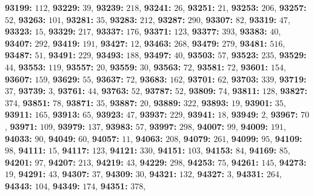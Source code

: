 \textsf{\bfseries 93199:} $112$, \textsf{\bfseries 93229:} $39$, \textsf{\bfseries 93239:} $218$, \textsf{\bfseries 93241:} $26$, \textsf{\bfseries 93251:} $21$, \textsf{\bfseries 93253:} $206$, \textsf{\bfseries 93257:} $52$, \textsf{\bfseries 93263:} $101$, \textsf{\bfseries 93281:} $35$, \textsf{\bfseries 93283:} $212$, \textsf{\bfseries 93287:} $290$, \textsf{\bfseries 93307:} $82$, \textsf{\bfseries 93319:} $47$, \textsf{\bfseries 93323:} $15$, \textsf{\bfseries 93329:} $217$, \textsf{\bfseries 93337:} $176$, \textsf{\bfseries 93371:} $123$, \textsf{\bfseries 93377:} $393$, \textsf{\bfseries 93383:} $40$, \textsf{\bfseries 93407:} $292$, \textsf{\bfseries 93419:} $191$, \textsf{\bfseries 93427:} $12$, \textsf{\bfseries 93463:} $268$, \textsf{\bfseries 93479:} $279$, \textsf{\bfseries 93481:} $516$, \textsf{\bfseries 93487:} $51$, \textsf{\bfseries 93491:} $229$, \textsf{\bfseries 93493:} $188$, \textsf{\bfseries 93497:} $40$, \textsf{\bfseries 93503:} $57$, \textsf{\bfseries 93523:} $235$, \textsf{\bfseries 93529:} $44$, \textsf{\bfseries 93553:} $119$, \textsf{\bfseries 93557:} $20$, \textsf{\bfseries 93559:} $30$, \textsf{\bfseries 93563:} $72$, \textsf{\bfseries 93581:} $72$, \textsf{\bfseries 93601:} $154$, \textsf{\bfseries 93607:} $159$, \textsf{\bfseries 93629:} $55$, \textsf{\bfseries 93637:} $72$, \textsf{\bfseries 93683:} $162$, \textsf{\bfseries 93701:} $62$, \textsf{\bfseries 93703:} $339$, \textsf{\bfseries 93719:} $37$, \textsf{\bfseries 93739:} $3$, \textsf{\bfseries 93761:} $44$, \textsf{\bfseries 93763:} $52$, \textsf{\bfseries 93787:} $52$, \textsf{\bfseries 93809:} $74$, \textsf{\bfseries 93811:} $128$, \textsf{\bfseries 93827:} $374$, \textsf{\bfseries 93851:} $78$, \textsf{\bfseries 93871:} $35$, \textsf{\bfseries 93887:} $20$, \textsf{\bfseries 93889:} $322$, \textsf{\bfseries 93893:} $19$, \textsf{\bfseries 93901:} $35$, \textsf{\bfseries 93911:} $165$, \textsf{\bfseries 93913:} $65$, \textsf{\bfseries 93923:} $47$, \textsf{\bfseries 93937:} $229$, \textsf{\bfseries 93941:} $18$, \textsf{\bfseries 93949:} $2$, \textsf{\bfseries 93967:} $70$, \textsf{\bfseries 93971:} $109$, \textsf{\bfseries 93979:} $137$, \textsf{\bfseries 93983:} $57$, \textsf{\bfseries 93997:} $298$, \textsf{\bfseries 94007:} $99$, \textsf{\bfseries 94009:} $191$, \textsf{\bfseries 94033:} $90$, \textsf{\bfseries 94049:} $60$, \textsf{\bfseries 94057:} $11$, \textsf{\bfseries 94063:} $208$, \textsf{\bfseries 94079:} $261$, \textsf{\bfseries 94099:} $95$, \textsf{\bfseries 94109:} $98$, \textsf{\bfseries 94111:} $15$, \textsf{\bfseries 94117:} $123$, \textsf{\bfseries 94121:} $330$, \textsf{\bfseries 94151:} $103$, \textsf{\bfseries 94153:} $84$, \textsf{\bfseries 94169:} $85$, \textsf{\bfseries 94201:} $97$, \textsf{\bfseries 94207:} $213$, \textsf{\bfseries 94219:} $43$, \textsf{\bfseries 94229:} $298$, \textsf{\bfseries 94253:} $75$, \textsf{\bfseries 94261:} $145$, \textsf{\bfseries 94273:} $19$, \textsf{\bfseries 94291:} $43$, \textsf{\bfseries 94307:} $37$, \textsf{\bfseries 94309:} $30$, \textsf{\bfseries 94321:} $132$, \textsf{\bfseries 94327:} $3$, \textsf{\bfseries 94331:} $264$, \textsf{\bfseries 94343:} $104$, \textsf{\bfseries 94349:} $174$, \textsf{\bfseries 94351:} $378$, 
